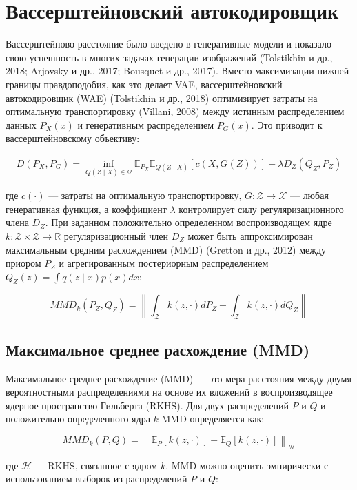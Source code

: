\documentclass{article}
\begin{document}
\section{Вассерштейновский автокодировщик}
Вассерштейново расстояние было введено в генеративные модели и показало свою успешность в многих задачах генерации изображений (Tolstikhin и др., 2018; Arjovsky и др., 2017; Bousquet и др., 2017). Вместо максимизации нижней границы правдоподобия, как это делает VAE, вассерштейновский автокодировщик (WAE) (Tolstikhin и др., 2018) оптимизирует затраты на оптимальную транспортировку (Villani, 2008) между истинным распределением данных \(P_X(x)\) и генеративным распределением \(P_G(x)\). Это приводит к вассерштейновскому объективу:

\[
\begin{aligned}
D(P_X, P_G) = \inf_{Q(Z \mid X) \in \mathcal{Q}} \mathbb{E}_{P_X} \mathbb{E}_{Q(Z \mid X)}[c(X, G(Z))] + \lambda D_Z(Q_Z, P_Z)
\end{aligned}
\]

где \(c(\cdot)\) — затраты на оптимальную транспортировку, \(G: \mathcal{Z} \rightarrow \mathcal{X}\) — любая генеративная функция, а коэффициент \(\lambda\) контролирует силу регуляризационного члена \(D_Z\). При заданном положительно определенном воспроизводящем ядре \(k: \mathcal{Z} \times \mathcal{Z} \rightarrow \mathbb{R}\) регуляризационный член \(D_Z\) может быть аппроксимирован максимальным средним расхождением (MMD) (Gretton и др., 2012) между приором \(P_Z\) и агрегированным постериорным распределением \(Q_Z(z) = \int q(z \mid x) p(x) dx\):

\[
MMD_k(P_Z, Q_Z) = \left\| \int_{\mathcal{Z}} k(z, \cdot) dP_Z - \int_{\mathcal{Z}} k(z, \cdot) dQ_Z \right\|
\]

\subsection{Максимальное среднее расхождение (MMD)}

Максимальное среднее расхождение (MMD) — это мера расстояния между двумя вероятностными распределениями на основе их вложений в воспроизводящее ядерное пространство Гильберта (RKHS). Для двух распределений \(P\) и \(Q\) и положительно определенного ядра \(k\) MMD определяется как:

\[
MMD_k(P, Q) = \left\| \mathbb{E}_P[k(z, \cdot)] - \mathbb{E}_Q[k(z, \cdot)] \right\|_{\mathcal{H}}
\]

где \(\mathcal{H}\) — RKHS, связанное с ядром \(k\). MMD можно оценить эмпирически с использованием выборок из распределений \(P\) и \(Q\):
\end{document}
